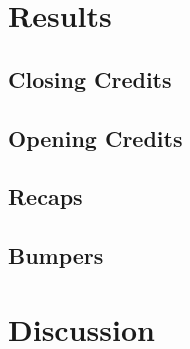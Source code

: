 \documentclass{article}
\begin{document}
\section{Results} \label{results}

\subsection{Closing Credits}\label{resultsclosingcredits}
\subsection{Opening Credits}\label{resultsopeningcredits}
\subsection{Recaps}\label{resultsrecaps}
\subsection{Bumpers}\label{resultsbumpers}

\section{Discussion} \label{discussion}



\end{document}
